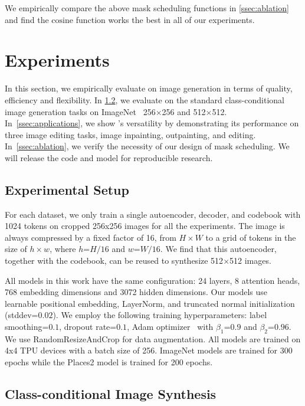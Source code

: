 We empirically compare the above mask scheduling functions in \ref{ssec:ablation} and find the $\text{cosine}$ function works the best in all of our experiments.
\section{Experiments}
\label{sec:experiments}

In this section, we empirically evaluate \model on image generation in terms of quality, efficiency and flexibility.
In \ref{ssec:class_conditional_synthesis}, we evaluate \model on the standard class-conditional image generation tasks on ImageNet~\cite{deng2009imagenet} 256$\times$256 and 512$\times$512.
In~\ref{ssec:applications}, we show \model's versatility by demonstrating its performance on three image editing tasks, image inpainting, outpainting, and editing. In~\ref{ssec:ablation}, we verify the necessity of our design of mask scheduling. We will release the code and model for reproducible research.

\subsection{Experimental Setup}
\label{ssec:architecture}

For each dataset, we only train a single autoencoder, decoder, and codebook with 1024 tokens on cropped 256x256 images for all the experiments. The image is always compressed by a fixed factor of 16, \ie from $H\times W$ to a grid of tokens in the size of $h \times w$, where $h$=$H / 16$ and $w$=$W/16$. We find that this autoencoder, together with the codebook, can be reused to synthesize 512$\times$512 images.

All models in this work have the same configuration: 24 layers, 8 attention heads, 768 embedding dimensions and 3072 hidden dimensions. Our models use learnable positional embedding\cite{Vaswani17attention}, LayerNorm\cite{ba2016layer}, and truncated normal initialization (stddev=$0.02$). We employ the following training hyperparameters: label smoothing=$0.1$, dropout rate=$0.1$, Adam optimizer~\cite{kingma2014adam} with $\beta_{1}$=$0.9$ and $\beta_{2}$=$0.96$. We use RandomResizeAndCrop for data augmentation. All models are trained on 4x4 TPU devices with a batch size of 256. ImageNet models are trained for 300 epochs while the Places2 model is trained for 200 epochs. 

\subsection{Class-conditional Image Synthesis}
\label{ssec:class_conditional_synthesis}

